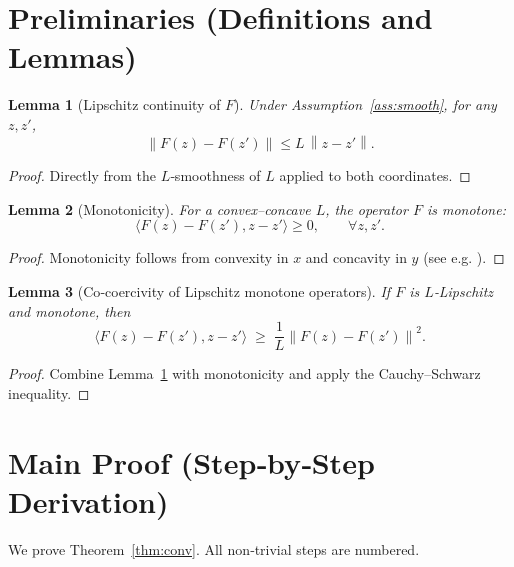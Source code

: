 \documentclass{article}
\newtheorem{lemma}{Lemma}
\newcommand{\norm}[1]{\left\|#1\right\|}
\newcommand{\inner}[2]{\langle #1,#2\rangle}
\begin{document}
\newpage
\section*{Preliminaries (Definitions and Lemmas)}
\begin{lemma}[Lipschitz continuity of $F$]\label{lem:lipschitz}
Under Assumption~\ref{ass:smooth}, for any $z,z'$,
\[
\norm{F(z)-F(z')}\le L\,\norm{z-z'}.
\]
\end{lemma}
\begin{proof}
Directly from the $L$‑smoothness of $L$ applied to both coordinates. \qedhere
\end{proof}

\begin{lemma}[Monotonicity]\label{lem:mono}
For a convex–concave $L$, the operator $F$ is monotone:
\[
\inner{F(z)-F(z')}{z-z'}\ge0,\qquad\forall z,z'.
\]
\end{lemma}
\begin{proof}
Monotonicity follows from convexity in $x$ and concavity in $y$ (see e.g. \cite{rockafellar1970}). \qedhere
\end{proof}

\begin{lemma}[Co‑coercivity of Lipschitz monotone operators]\label{lem:coercive}
If $F$ is $L$‑Lipschitz and monotone, then
\[
\inner{F(z)-F(z')}{z-z'}\;\ge\;\frac{1}{L}\norm{F(z)-F(z')}^{2}.
\]
\end{lemma}
\begin{proof}
Combine Lemma~\ref{lem:lipschitz} with monotonicity and apply the Cauchy–Schwarz inequality. \qedhere
\end{proof}

\section*{Main Proof (Step‑by‑Step Derivation)}
We prove Theorem~\ref{thm:conv}.  All non‑trivial steps are numbered.
\end{document}
